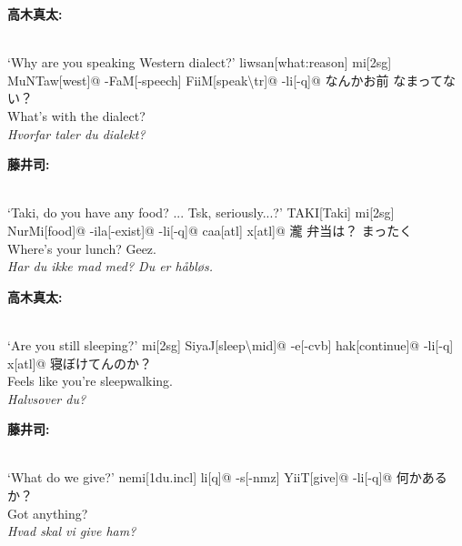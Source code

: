 \begin{paracol}{2}
\bigskip
\switchcolumn*
\hfill \textbf{高木真太:}

\switchcolumn

\exdisplay[lingstyle=Conversation]
\begingl 
\glpreamble
\textbf{}\\
`Why are you speaking Western dialect?'
\endpreamble
liwsan[what:reason]
mi[\sc 2sg]
MuNTaw[west]@
-FaM[-speech]
FiiM[speak\textbackslash{\sc tr}]@
-li[\sc -q]@
\glft
なんかお前 なまってない？\\
What's with the dialect?\\
\textit{Hvorfar taler du dialekt?}
\endgl
\xe

\bigskip
\switchcolumn*
\hfill \textbf{藤井司:}

\switchcolumn

\exdisplay[lingstyle=Conversation]
\begingl 
\glpreamble
\textbf{}\\
`Taki, do you have any food? ... Tsk, seriously...?'
\endpreamble
\textrm{T}AKI[Taki]
mi[\sc 2sg]
NurMi[food]@
-ila[\sc -exist]@
-li[\sc -q]@
caa[\sc atl]
x[\sc atl]@
\glft
瀧 弁当は？ まったく\\
Where's your lunch? Geez.\\
\textit{Har du ikke mad med? Du er håbløs.}
\endgl
\xe

\bigskip
\switchcolumn*
\hfill \textbf{高木真太:}

\switchcolumn

\exdisplay[lingstyle=Conversation]
\begingl 
\glpreamble
\textbf{}\\
`Are you still sleeping?'
\endpreamble
mi[\sc 2sg]
SiyaJ[sleep\textbackslash{\sc mid}]@
-e\lilglot{}[\sc -cvb]
hak[continue]@
-li[\sc -q]
x[\sc atl]@
\glft
寝ぼけてんのか？\\
Feels like you're sleepwalking.\\
\textit{Halvsover du?}
\endgl
\xe

\bigskip
\switchcolumn*
\hfill \textbf{藤井司:}

\switchcolumn

\exdisplay[lingstyle=Conversation]
\begingl 
\glpreamble
\textbf{}\\
`What do we give?'
\endpreamble
nemi[\sc 1du.incl]
li[\sc q]@
-s[\sc -nmz]
YiiT[give]@
-li[\sc -q]@
\glft
何かあるか？\\
Got anything?\\
\textit{Hvad skal vi give ham?}
\endgl
\xe


\end{paracol}
